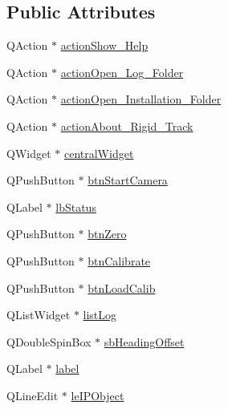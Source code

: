\subsection*{Public Attributes}
\begin{DoxyCompactItemize}
\item 
Q\+Action $\ast$ \hyperlink{class_ui___rigid_track_class_aeb9fefc5e71112c520ae22f6e818d01f}{action\+Show\+\_\+\+Help}
\item 
Q\+Action $\ast$ \hyperlink{class_ui___rigid_track_class_a3fb674ec6f96c57d3eef03900b7162ba}{action\+Open\+\_\+\+Log\+\_\+\+Folder}
\item 
Q\+Action $\ast$ \hyperlink{class_ui___rigid_track_class_adbf50ad17608dbfe8a688dc8f18d1ec3}{action\+Open\+\_\+\+Installation\+\_\+\+Folder}
\item 
Q\+Action $\ast$ \hyperlink{class_ui___rigid_track_class_adc074cede51e875e17c38bf23375550a}{action\+About\+\_\+\+Rigid\+\_\+\+Track}
\item 
Q\+Widget $\ast$ \hyperlink{class_ui___rigid_track_class_ad0855ddf1efd8f0c8821dd2142f6221d}{central\+Widget}
\item 
Q\+Push\+Button $\ast$ \hyperlink{class_ui___rigid_track_class_a72fc55bdb6021b52b9ec0e97e112d57d}{btn\+Start\+Camera}
\item 
Q\+Label $\ast$ \hyperlink{class_ui___rigid_track_class_abeac37c5be33dbe8f2805a9e688b8329}{lb\+Status}
\item 
Q\+Push\+Button $\ast$ \hyperlink{class_ui___rigid_track_class_acc37707b26574be199e2f33d2f2c31fe}{btn\+Zero}
\item 
Q\+Push\+Button $\ast$ \hyperlink{class_ui___rigid_track_class_aac22c36a194fd08f919a8e00a78cb1b0}{btn\+Calibrate}
\item 
Q\+Push\+Button $\ast$ \hyperlink{class_ui___rigid_track_class_aafe138bcd4b21e4608ab39f76ca6e042}{btn\+Load\+Calib}
\item 
Q\+List\+Widget $\ast$ \hyperlink{class_ui___rigid_track_class_a8573490fa3f39f7c45af77f33c9b9297}{list\+Log}
\item 
Q\+Double\+Spin\+Box $\ast$ \hyperlink{class_ui___rigid_track_class_a7a9db994f872078ce46a81b435f70cf9}{sb\+Heading\+Offset}
\item 
Q\+Label $\ast$ \hyperlink{class_ui___rigid_track_class_a2de57788f55b334c451dc9d0449b104c}{label}
\item 
Q\+Line\+Edit $\ast$ \hyperlink{class_ui___rigid_track_class_a8372ffd3f54aa2672228e28e48fe18f3}{le\+I\+P\+Object}
\item 

\end{DoxyCompactItemize}
